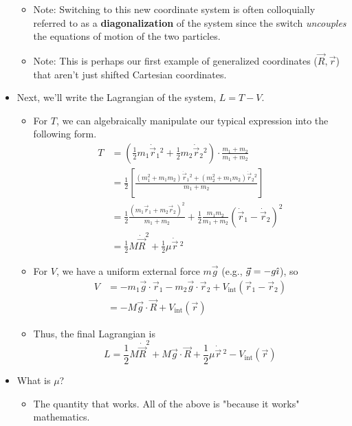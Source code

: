\documentclass[../notes.tex]{subfiles}
\begin{document}
\begin{itemize}
\begin{itemize}
        \item Note: Switching to this new coordinate system is often colloquially referred to as a \textbf{diagonalization} of the system since the switch \emph{uncouples} the equations of motion of the two particles.
        \item Note: This is perhaps our first example of generalized coordinates ($\vec{R},\vec{r}$) that aren't just shifted Cartesian coordinates.
    \end{itemize}
    \item Next, we'll write the Lagrangian of the system, $L=T-V$.
    \begin{itemize}
        \item For $T$, we can algebraically manipulate our typical expression into the following form.
        \begin{align*}
            T &= \left( \frac{1}{2}m_1\dot{\vec{r}}_1{}^2+\frac{1}{2}m_2\dot{\vec{r}}_2{}^2 \right)\cdot\frac{m_1+m_2}{m_1+m_2}\\
            &= \frac{1}{2}\left[ \frac{(m_1^2+m_1m_2)\dot{\vec{r}}_1{}^2+(m_2^2+m_1m_2)\dot{\vec{r}}_2{}^2}{m_1+m_2} \right]\\
            &= \frac{1}{2}\frac{(m_1\vec{r}_1+m_2\vec{r}_2)^2}{m_1+m_2}+\frac{1}{2}\frac{m_1m_2}{m_1+m_2}(\dot{\vec{r}}_1-\dot{\vec{r}}_2)^2\\
            &= \frac{1}{2}M\dot{\vec{R}}^2+\frac{1}{2}\mu\dot{\vec{r}}{\,}^2
        \end{align*}
        \item For $V$, we have a uniform external force $m\vec{g}$ (e.g., $\vec{g}=-g\hat{\imath}$), so
        \begin{align*}
            V &= -m_1\vec{g}\cdot\vec{r}_1-m_2\vec{g}\cdot\vec{r}_2+V_\text{int}(\vec{r}_1-\vec{r}_2)\\
            &= -M\vec{g}\cdot\vec{R}+V_\text{int}(\vec{r})
        \end{align*}
        \item Thus, the final Lagrangian is
        \begin{equation*}
            L = \frac{1}{2}M\dot{\vec{R}}^2+M\vec{g}\cdot\vec{R}+\frac{1}{2}\mu\dot{\vec{r}}{\,}^2-V_\text{int}(\vec{r})
        \end{equation*}
    \end{itemize}
    \item What is $\mu$?
    \begin{itemize}
        \item The quantity that works. All of the above is "because it works" mathematics.

\end{itemize}
\end{itemize}
\end{document}
